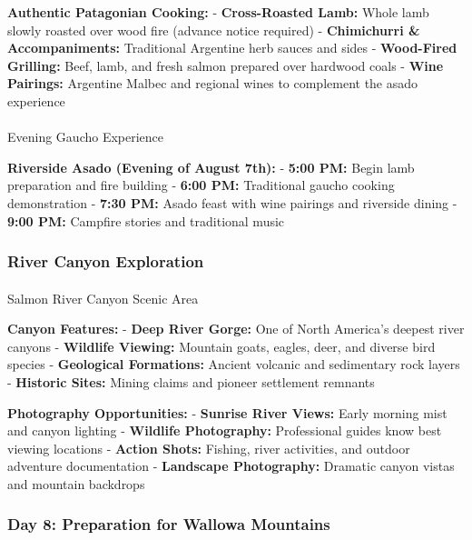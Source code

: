 \documentclass[
  11pt,
  letterpaper,
  DIV=10,
  numbers=noendperiod]{scrartcl}
\makeatletter
\let\oldparagraph\paragraph
\renewcommand{\paragraph}{
    \@ifstar
      \xxxParagraphStar
      \xxxParagraphNoStar
  }
\newcommand{\xxxParagraphStar}[1]{\oldparagraph*{#1}\mbox{}}
\newcommand{\xxxParagraphNoStar}[1]{\oldparagraph{#1}\mbox{}}
\makeatother
\begin{document}
\textbf{Authentic Patagonian Cooking:} - \textbf{Cross-Roasted Lamb:}
Whole lamb slowly roasted over wood fire (advance notice required) -
\textbf{Chimichurri \& Accompaniments:} Traditional Argentine herb
sauces and sides - \textbf{Wood-Fired Grilling:} Beef, lamb, and fresh
salmon prepared over hardwood coals - \textbf{Wine Pairings:} Argentine
Malbec and regional wines to complement the asado experience

\paragraph{Evening Gaucho Experience}\label{evening-gaucho-experience}

\textbf{Riverside Asado (Evening of August 7th):} - \textbf{5:00 PM:}
Begin lamb preparation and fire building - \textbf{6:00 PM:} Traditional
gaucho cooking demonstration - \textbf{7:30 PM:} Asado feast with wine
pairings and riverside dining - \textbf{9:00 PM:} Campfire stories and
traditional music

\subsubsection{River Canyon Exploration}\label{river-canyon-exploration}

\paragraph{Salmon River Canyon Scenic
Area}\label{salmon-river-canyon-scenic-area}

\textbf{Canyon Features:} - \textbf{Deep River Gorge:} One of North
America's deepest river canyons - \textbf{Wildlife Viewing:} Mountain
goats, eagles, deer, and diverse bird species - \textbf{Geological
Formations:} Ancient volcanic and sedimentary rock layers -
\textbf{Historic Sites:} Mining claims and pioneer settlement remnants

\textbf{Photography Opportunities:} - \textbf{Sunrise River Views:}
Early morning mist and canyon lighting - \textbf{Wildlife Photography:}
Professional guides know best viewing locations - \textbf{Action Shots:}
Fishing, river activities, and outdoor adventure documentation -
\textbf{Landscape Photography:} Dramatic canyon vistas and mountain
backdrops

\subsubsection{Day 8: Preparation for Wallowa
Mountains}\label{day-8-preparation-for-wallowa-mountains}
\end{document}
